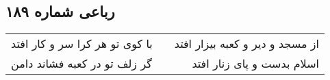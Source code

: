 \begin{center}
\section*{رباعی شماره ۱۸۹}
\label{sec:sh189}
\begin{longtable}{l p{0.5cm} r}
با کوی تو هر کرا سر و کار افتد
&&
از مسجد و دیر و کعبه بیزار افتد
\\
گر زلف تو در کعبه فشاند دامن
&&
اسلام بدست و پای زنار افتد
\\
\end{longtable}
\end{center}
